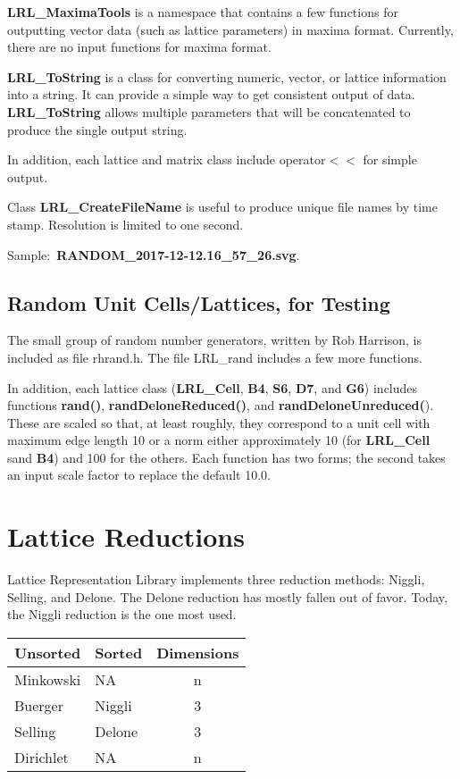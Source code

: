 \documentclass[11pt]{article} %
\begin{document}
\textbf{LRL\_MaximaTools} is a namespace that contains a few functions for outputting vector data (such as lattice parameters) in maxima format. Currently, there are no input functions for maxima format.

\textbf{LRL\_ToString} is a class for converting numeric, vector, or lattice information into a string. It can provide a simple way to get consistent output of data. \textbf{LRL\_ToString}  allows multiple parameters that will be concatenated to produce the single output string.

In addition, each lattice and matrix class include operator$<<$ for simple output.

Class \textbf{LRL\_CreateFileName} is useful to produce unique file names by time stamp. Resolution is limited to one second.

Sample$\colon$ \mbox{\textbf{RANDOM\_2017-12-12.16\_57\_26.svg}}.

\subsection{Random Unit Cells/Lattices, for Testing}


The small group of random number generators, written by Rob Harrison, is included as file rhrand.h. The file LRL\_rand includes a few more functions.

In addition, each lattice class (\textbf{LRL\_Cell}, \textbf{B4}, \textbf{S6}, \textbf{D7}, and \textbf{G6}) includes functions \textbf{rand()}, \textbf{randDeloneReduced()}, and \textbf{randDeloneUnreduced(}). These are scaled so that, at least roughly, they correspond to a unit cell with maximum edge length 10 or a norm either approximately 10 (for \textbf{LRL\_Cell} sand \textbf{B4}) and 100 for the others. Each function has two forms; the second takes an input scale factor to replace the default 10.0.

\section{Lattice Reductions}

Lattice Representation Library implements three reduction methods: Niggli, Selling, and Delone. The Delone reduction has mostly fallen out of favor. Today, the Niggli reduction is the one most used. 

\begin{center}
\begin{tabular}{|l|l|c|} %
\hline %
Unsorted & Sorted & Dimensions \\
\hline
Minkowski & NA & n \\
Buerger & Niggli & 3 \\
Selling & Delone & 3 \\
Dirichlet & NA & n \\
\hline
\end{tabular}
\end{center}
\end{document}
